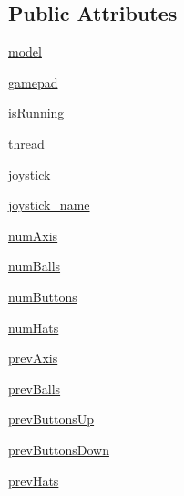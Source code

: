 \subsection*{Public Attributes}
\begin{DoxyCompactItemize}
\item 
\hyperlink{classdriver_1_1LOGITECH__GAMEPAD__DRIVER_1_1LogitechGamepadDriver_ac54e7c4869c9decf776fd9cbb6bb0ff1}{model}
\item 
\hyperlink{classdriver_1_1LOGITECH__GAMEPAD__DRIVER_1_1LogitechGamepadDriver_aaf139aa0b1f0a61e3f6d4317f72eb545}{gamepad}
\item 
\hyperlink{classdriver_1_1LOGITECH__GAMEPAD__DRIVER_1_1LogitechGamepadDriver_aef0d7a902497fef0428277338fec5ecc}{is\+Running}
\item 
\hyperlink{classdriver_1_1LOGITECH__GAMEPAD__DRIVER_1_1LogitechGamepadDriver_a1d2fc0513bb62f3db14e1b346146690c}{thread}
\item 
\hyperlink{classdriver_1_1LOGITECH__GAMEPAD__DRIVER_1_1LogitechGamepadDriver_abb094faa771c682c012330e302a7d5b9}{joystick}
\item 
\hyperlink{classdriver_1_1LOGITECH__GAMEPAD__DRIVER_1_1LogitechGamepadDriver_a8e7f952cf9141a4dc99879abca9417fd}{joystick\+\_\+name}
\item 
\hyperlink{classdriver_1_1LOGITECH__GAMEPAD__DRIVER_1_1LogitechGamepadDriver_a8372ef74e2512157f330a375f49e2a5a}{num\+Axis}
\item 
\hyperlink{classdriver_1_1LOGITECH__GAMEPAD__DRIVER_1_1LogitechGamepadDriver_a30d314723c44331751f0401c71a3f531}{num\+Balls}
\item 
\hyperlink{classdriver_1_1LOGITECH__GAMEPAD__DRIVER_1_1LogitechGamepadDriver_a2fc0fc1494b1da9c730a82489b4366bb}{num\+Buttons}
\item 
\hyperlink{classdriver_1_1LOGITECH__GAMEPAD__DRIVER_1_1LogitechGamepadDriver_a6b0855ed9f8492c59266ef282b91906c}{num\+Hats}
\item 
\hyperlink{classdriver_1_1LOGITECH__GAMEPAD__DRIVER_1_1LogitechGamepadDriver_a98667a083c870cdf65ea8e047610b9a3}{prev\+Axis}
\item 
\hyperlink{classdriver_1_1LOGITECH__GAMEPAD__DRIVER_1_1LogitechGamepadDriver_abfa5d9779b86d4914b2331f36daf5da3}{prev\+Balls}
\item 
\hyperlink{classdriver_1_1LOGITECH__GAMEPAD__DRIVER_1_1LogitechGamepadDriver_ae1e571536fd2c9e2d1c8fe9c26faf679}{prev\+Buttons\+Up}
\item 
\hyperlink{classdriver_1_1LOGITECH__GAMEPAD__DRIVER_1_1LogitechGamepadDriver_aa26068a6236421363dc2a4a373f134d5}{prev\+Buttons\+Down}
\item 
\hyperlink{classdriver_1_1LOGITECH__GAMEPAD__DRIVER_1_1LogitechGamepadDriver_aa8da5cd73f609421083322375f6f5299}{prev\+Hats}
\end{DoxyCompactItemize}


